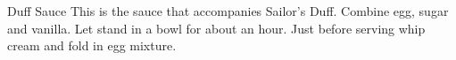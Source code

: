 \begin{recipe}{Duff Sauce}{}{}
\freeform This is the sauce that accompanies Sailor's Duff.
Combine egg, sugar and vanilla.  Let stand in a bowl for about an hour.  Just before serving whip cream and fold in egg mixture.
\end{recipe}
